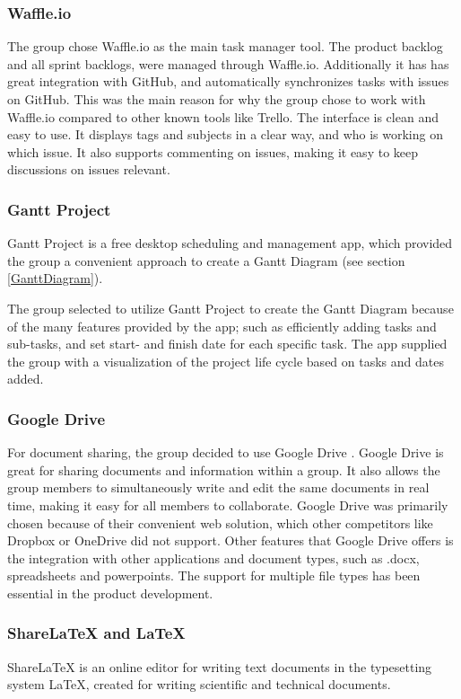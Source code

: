 \subsubsection{Waffle.io}
\label{Waffle.io}
The group chose Waffle.io \cite{Waffle} as the main task manager tool. The product backlog and all sprint backlogs, were managed through Waffle.io. Additionally it has has great integration with GitHub, and automatically synchronizes tasks with issues on GitHub. This was the main reason for why the group chose to work with Waffle.io compared to other known tools like Trello. The interface is clean and easy to use. It displays tags and subjects in a clear way, and who is working on which issue. It also supports commenting on issues, making it easy to keep discussions on issues relevant. 

\subsubsection{Gantt Project} \label{sss:Gant_Project} 
Gantt Project \cite{Gantt} is a free desktop scheduling and management app, which provided the group a convenient approach to create a Gantt Diagram (see section \ref{GanttDiagram}). 

The group selected to utilize Gantt Project to create the Gantt Diagram because of the many features provided by the app; such as efficiently adding tasks and sub-tasks, and set start- and finish date for each specific task. The app supplied the group with a visualization of the project life cycle based on tasks and dates added.  


\subsubsection{Google Drive}
For document sharing, the group decided to use Google Drive \cite{GoogleDrive}. Google Drive is great for sharing documents and information within a group. It also allows the group members to simultaneously write and edit the same documents in real time, making it easy for all members to collaborate. Google Drive was primarily chosen because of their convenient web solution, which other competitors like Dropbox or OneDrive did not support. Other features that Google Drive offers is the integration with other applications and document types, such as .docx, spreadsheets and powerpoints. The support for multiple file types has been essential in the product development.

\subsubsection{ShareLaTeX and LaTeX}
ShareLaTeX \cite{ShareLatex} is an online editor for writing text documents in the typesetting system LaTeX, created for writing scientific and technical documents.   

